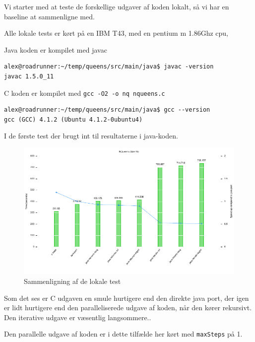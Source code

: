 Vi starter med at teste de forskellige udgaver af koden lokalt, så vi har en
baseline at sammenligne med.

Alle lokale tests er kørt på en IBM T43, med en pentium m 1.86Ghz cpu, 

Java koden er kompilet med javac

\begin{verbatim}
alex@roadrunner:~/temp/queens/src/main/java$ javac -version
javac 1.5.0_11
\end{verbatim}

C koden er kompilet med \texttt{gcc -O2 -o nq nqueens.c}

\begin{verbatim}
alex@roadrunner:~/temp/queens/src/main/java$ gcc --version
gcc (GCC) 4.1.2 (Ubuntu 4.1.2-0ubuntu4)
\end{verbatim}

I de første test der brugt int til resultaterne i java-koden. 

\begin{figure}[h]
\begin{center}
\includegraphics{../benchmarks/lokal.pdf}
\caption{Sammenligning af de lokale test} 
\label{figur:lokal}
\end{center}
\end{figure}

Som det ses er C udgaven en smule hurtigere end den direkte java port, der igen
er lidt hurtigere end den paralleliserede udgave af koden, når den kører
rekursivt. Den iterative udgave er væsentlig langsommere..

Den parallelle udgave af koden er i dette tilfælde her kørt med
\texttt{maxSteps} på 1. 

